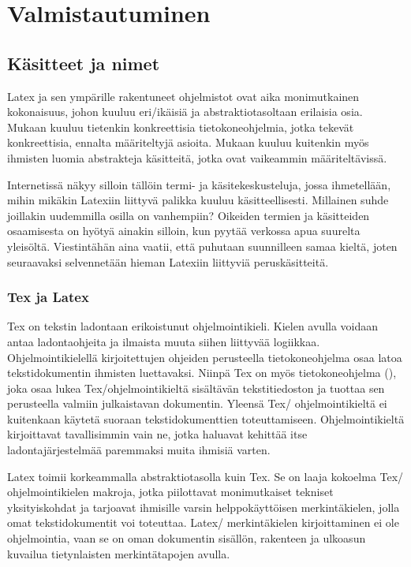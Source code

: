 
\chapter{Valmistautuminen}

\section{Käsitteet ja nimet}

Latex ja sen ympärille rakentuneet ohjelmistot ovat aika monimutkainen
kokonaisuus, johon kuuluu eri\-/ikäisiä ja abstraktiotasoltaan erilaisia
osia. Mukaan kuuluu tietenkin konkreettisia tietokoneohjelmia, jotka
tekevät konkreettisia, ennalta määriteltyjä asioita. Mukaan kuuluu
kuitenkin myös ihmisten luomia abstrakteja käsitteitä, jotka ovat
vaikeammin määriteltävissä.

Internetissä näkyy silloin tällöin termi- ja käsitekeskusteluja, jossa
ihmetellään, mihin mikäkin Latexiin liittyvä palikka kuuluu
käsitteellisesti. Millainen suhde joillakin uudemmilla osilla on
vanhempiin? Oikeiden termien ja käsitteiden osaamisesta on hyötyä
ainakin silloin, kun pyytää verkossa apua suurelta yleisöltä.
Viestintähän aina vaatii, että puhutaan suunnilleen samaa kieltä, joten
seuraavaksi selvennetään hieman Latexiin liittyviä peruskäsitteitä.

\subsection{Tex ja Latex}

Tex on tekstin ladontaan erikoistunut ohjelmointikieli. Kielen avulla
voidaan antaa ladontaohjeita ja ilmaista muuta siihen liittyvää
logiikkaa. Ohjelmointikielellä kirjoitettujen ohjeiden perusteella
tietokoneohjelma osaa latoa tekstidokumentin ihmisten luettavaksi.
Niinpä Tex on myös tietokoneohjelma (), joka osaa lukea
Tex\-/ohjelmointikieltä sisältävän tekstitiedoston ja tuottaa sen
perusteella valmiin julkaistavan dokumentin. Yleensä Tex\-/
ohjelmointikieltä ei kuitenkaan käytetä suoraan tekstidokumenttien
toteuttamiseen. Ohjelmointikieltä kirjoittavat tavallisimmin vain ne,
jotka haluavat kehittää itse ladontajärjestelmää paremmaksi muita
ihmisiä varten.

Latex toimii korkeammalla abstraktiotasolla kuin Tex. Se on laaja
kokoelma Tex\-/ ohjelmointikielen makroja, jotka piilottavat
monimutkaiset tekniset yksityiskohdat ja tarjoavat ihmisille varsin
helppokäyttöisen merkintäkielen, jolla omat tekstidokumentit voi
toteuttaa. Latex\-/ merkintäkielen kirjoittaminen ei ole ohjelmointia,
vaan se on oman dokumentin sisällön, rakenteen ja ulkoasun kuvailua
tietynlaisten merkintätapojen avulla.

